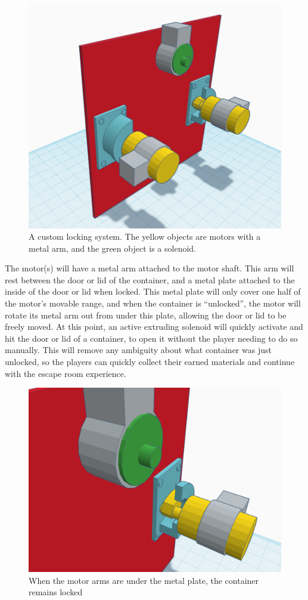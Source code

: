 \documentclass[conference]{IEEEtran}
\begin{document}
\begin{figure}[H]
    \centering
    \includegraphics[width=0.85\columnwidth]{Images/LockMech.png}
    \caption{A custom locking system. The yellow objects are motors with a metal arm, and the green object is a solenoid.}
\end{figure}

\indent The motor(s) will have a metal arm attached to the motor shaft. This arm will rest between the
door or lid of the container, and a metal plate attached to the inside of the door or lid when locked.
This metal plate will only cover one half of the motor's movable range, and when the container is ``unlocked'',
the motor will rotate its metal arm out from under this plate, allowing the door or lid to be freely moved.
At this point, an active extruding solenoid will quickly activate and hit the door or lid of a container, to
open it without the player needing to do so manually. This will remove any ambiguity about what container
was just unlocked, so the players can quickly collect their earned materials and continue with the escape room
experience.

\begin{figure}[H]
    \centering
    \includegraphics[width=0.85\columnwidth]{Images/ClosedLock.png}
    \caption{When the motor arms are under the metal plate, the container remains locked}
\end{figure}
\end{document}
